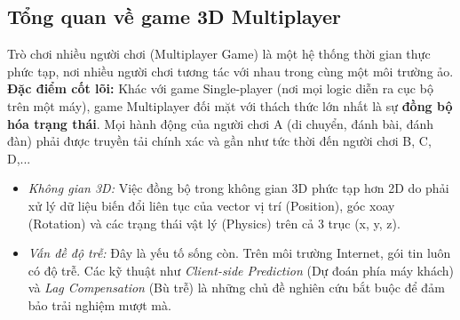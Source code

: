 
\subsection{Tổng quan về game 3D Multiplayer}
    Trò chơi nhiều người chơi (Multiplayer Game) là một hệ thống thời gian thực phức tạp, nơi nhiều người chơi tương tác với nhau trong cùng một môi trường ảo.\\
    
    \textbf{Đặc điểm cốt lõi:}
    Khác với game Single-player (nơi mọi logic diễn ra cục bộ trên một máy), game Multiplayer đối mặt với thách thức lớn nhất là sự \textbf{đồng bộ hóa trạng thái}. Mọi hành động của người chơi A (di chuyển, đánh bài, đánh đàn) phải được truyền tải chính xác và gần như tức thời đến người chơi B, C, D,...
    \begin{itemize}
        \item \textit{Không gian 3D:} Việc đồng bộ trong không gian 3D phức tạp hơn 2D do phải xử lý dữ liệu biến đổi liên tục của vector vị trí (Position), góc xoay (Rotation) và các trạng thái vật lý (Physics) trên cả 3 trục (x, y, z).
        \item \textit{Vấn đề độ trễ:} Đây là yếu tố sống còn. Trên môi trường Internet, gói tin luôn có độ trễ. Các kỹ thuật như \textit{Client-side Prediction} (Dự đoán phía máy khách) và \textit{Lag Compensation} (Bù trễ) là những chủ đề nghiên cứu bắt buộc để đảm bảo trải nghiệm mượt mà.
    \end{itemize}
    